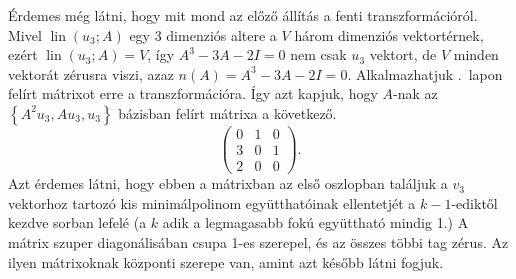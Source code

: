 \documentclass[9pt, a4paper, showtrims]{memoir}
\theoremstyle{plain}
\theoremstyle{remark}
\theoremstyle{definition}
\DeclareMathOperator{\lin}{lin}
\begin{document}
Érdemes még látni, hogy mit mond az előző állítás a fenti transzformációról.
Mivel $\lin\left( u_3;A \right)$ egy 3 dimenziós altere a $V$ három dimenziós vektortérnek,
ezért $\lin\left( u_3;A \right)=V$, így $A^{3}-3A-2I=0$ nem csak $u_3$ vektort, de $V$ minden vektorát zérusra viszi,
azaz $n\left( A \right)=A^3-3A-2I=0$.
Alkalmazhatjuk .~lapon felírt mátrixot erre a transzformációra.
Így azt kapjuk, hogy $A$-nak az $\left\{A^2u_3,Au_3,u_3\right\}$ bázisban felírt mátrixa a következő.
\[
    \begin{pmatrix}
        0&1&0\\
        3&0&1\\
        2&0&0
    \end{pmatrix}.
\]
Azt érdemes látni, hogy ebben a mátrixban az első oszlopban találjuk a $v_3$ vektorhoz tartozó kis minimálpolinom együtthatóinak ellentetjét
a $k-1$-ediktől kezdve sorban lefelé (a $k$ adik a legmagasabb fokú együttható mindig 1.)
A mátrix szuper diagonálisában csupa 1-es szerepel, és az összes többi tag zérus. 
Az ilyen mátrixoknak központi szerepe van, amint azt később látni fogjuk.
\end{document}
